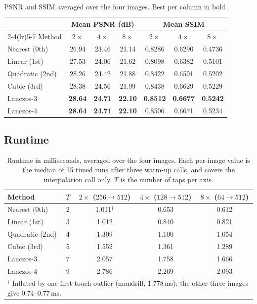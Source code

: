 \documentclass[11pt,a4paper]{article}
\begin{document}
\begin{table}[H]
\centering
\caption{PSNR and SSIM averaged over the four images. Best per column in bold.}
\label{tab:mean}
\begin{tabular}{lccc@{\hskip 1.1cm}ccc}
\toprule
& \multicolumn{3}{c}{Mean PSNR (dB)} & \multicolumn{3}{c}{Mean SSIM} \\
\cmidrule(lr){2-4}\cmidrule(lr){5-7}
Method & $2\times$ & $4\times$ & $8\times$ & $2\times$ & $4\times$ & $8\times$ \\
\midrule
Nearest (0th)   & 26.94 & 23.46 & 21.14 & 0.8286 & 0.6290 & 0.4736 \\
Linear (1st)    & 27.53 & 24.06 & 21.62 & 0.8098 & 0.6382 & 0.5101 \\
Quadratic (2nd) & 28.26 & 24.42 & 21.88 & 0.8422 & 0.6591 & 0.5202 \\
Cubic (3rd)     & 28.38 & 24.56 & 21.99 & 0.8438 & 0.6629 & 0.5229 \\
Lanczos-3       & \textbf{28.64} & \textbf{24.71} & \textbf{22.10} & \textbf{0.8512} &
                  \textbf{0.6677} & \textbf{0.5242} \\
Lanczos-4       & \textbf{28.64} & \textbf{24.71} & \textbf{22.10} & 0.8506 & 0.6671 & 0.5234 \\
\bottomrule
\end{tabular}
\end{table}

\subsection{Runtime}

\begin{table}[H]
\centering
\caption{Runtime in milliseconds, averaged over the four images. Each per-image value is the
median of 15 timed runs after three warm-up calls, and covers the interpolation call only.
$T$ is the number of taps per axis.}
\label{tab:runtime}
\begin{tabular}{lcccc}
\toprule
Method & $T$ & $2\times$ ($256\!\to\!512$) & $4\times$ ($128\!\to\!512$) & $8\times$ ($64\!\to\!512$) \\
\midrule
Nearest (0th)   & 2 & 1.011$^{\dagger}$ & 0.653 & 0.612 \\
Linear (1st)    & 3 & 1.012 & 0.840 & 0.821 \\
Quadratic (2nd) & 4 & 1.309 & 1.100 & 1.054 \\
Cubic (3rd)     & 5 & 1.552 & 1.361 & 1.289 \\
Lanczos-3       & 7 & 2.057 & 1.758 & 1.666 \\
Lanczos-4       & 9 & 2.786 & 2.269 & 2.093 \\
\bottomrule
\multicolumn{5}{l}{\footnotesize $^{\dagger}$ Inflated by one first-touch outlier
(mandrill, 1.778\,ms); the other three images give $0.74$--$0.77$\,ms.}
\end{tabular}
\end{table}
\end{document}
